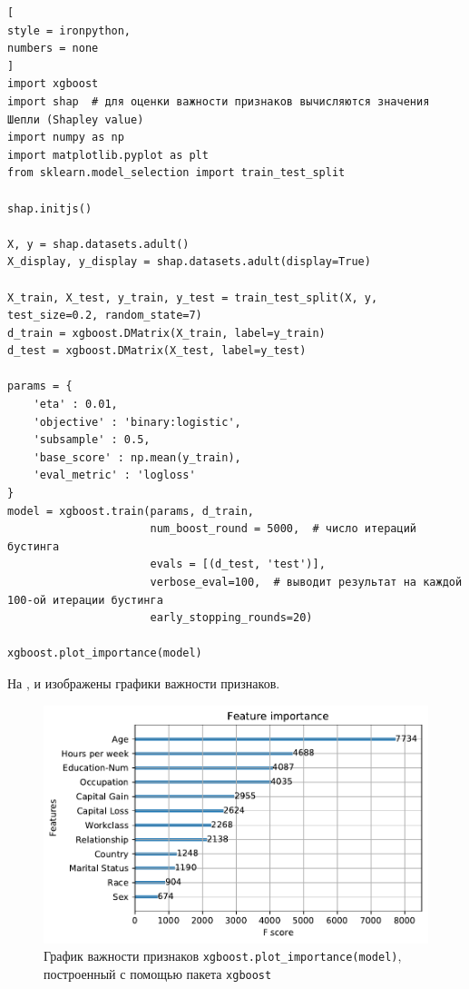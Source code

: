 \documentclass[%
	11pt,
	a4paper,
	utf8,
		]{article}
\begin{document}
\begin{lstlisting}[
style = ironpython,
numbers = none
]
import xgboost
import shap  # для оценки важности признаков вычисляются значения Шепли (Shapley value)
import numpy as np
import matplotlib.pyplot as plt
from sklearn.model_selection import train_test_split

shap.initjs()

X, y = shap.datasets.adult()
X_display, y_display = shap.datasets.adult(display=True)

X_train, X_test, y_train, y_test = train_test_split(X, y, test_size=0.2, random_state=7)
d_train = xgboost.DMatrix(X_train, label=y_train)
d_test = xgboost.DMatrix(X_test, label=y_test)

params = {
    'eta' : 0.01,
    'objective' : 'binary:logistic',
    'subsample' : 0.5,
    'base_score' : np.mean(y_train),
    'eval_metric' : 'logloss'        
}
model = xgboost.train(params, d_train,
                      num_boost_round = 5000,  # число итераций бустинга
                      evals = [(d_test, 'test')],
                      verbose_eval=100,  # выводит результат на каждой 100-ой итерации бустинга
                      early_stopping_rounds=20)

xgboost.plot_importance(model)
\end{lstlisting}

На ,  и  изображены графики важности признаков.

\begin{figure}[h]
	\centering
	\includegraphics[scale=0.75]{figures/xgboost_plot.pdf}
	\caption{График важности признаков \lstinline{xgboost.plot_importance(model)},\\построенный с помощью пакета \texttt{xgboost} }\label{fig:xgboost_plot}
\end{figure}
\end{document}
